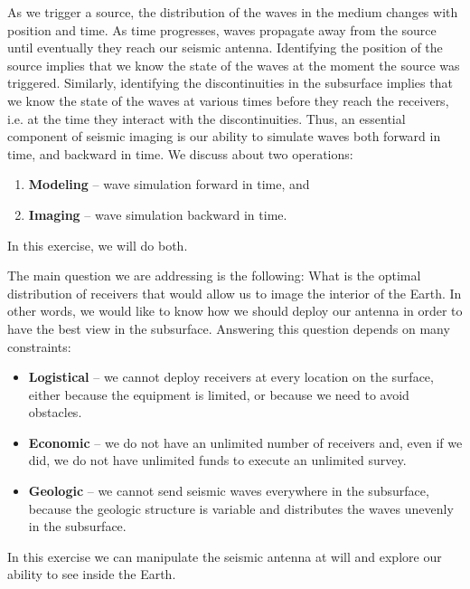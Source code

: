 As we trigger a source, the distribution of the waves in the medium changes with position and time. As time progresses, waves propagate away from the source until eventually they reach our seismic antenna. Identifying the position of the source implies that we know the state of the waves at the moment the source was triggered. Similarly, identifying the discontinuities in the subsurface implies that we know the state of the waves at various times before they reach the receivers, i.e. at the time they interact with the discontinuities. Thus, an essential component of seismic imaging is our ability to simulate waves both forward in time, and backward in time. We discuss about two operations:
\begin{enumerate}
\item \textbf{Modeling} -- wave simulation forward in time, and
\item \textbf{Imaging} -- wave simulation backward in time.
\end{enumerate} 
In this exercise, we will do both.

The main question we are addressing is the following: What is the optimal distribution of receivers that would allow us to image the interior of the Earth. In other words, we would like to know how we should deploy our antenna in order to have the best view in the subsurface. Answering this question depends on many constraints:
\begin{itemize}
\item \textbf{Logistical} -- we cannot deploy receivers at every location on the surface, either because the equipment is limited, or because we need to avoid obstacles.
\item \textbf{Economic} -- we do not have an unlimited number of receivers and, even if we did, we do not have unlimited funds to execute an unlimited survey.
\item \textbf{Geologic} -- we cannot send seismic waves everywhere in the subsurface, because the geologic structure is variable and distributes the waves unevenly in the subsurface.
\end{itemize}
In this exercise we can manipulate the seismic antenna at will and explore our ability to see inside the Earth.
 